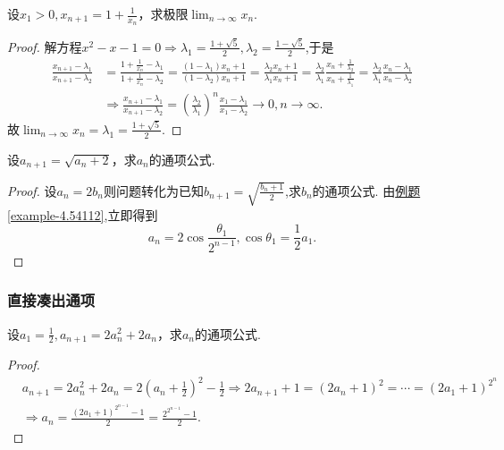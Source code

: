 \documentclass[../../main.tex]{subfiles}%
\begin{document}
\begin{example}
设\(x_1 > 0,x_{n + 1}=1+\frac{1}{x_n}\)，求极限\(\lim_{n\rightarrow\infty}x_n\).
\end{example}
\begin{proof}

解方程\(x^2 - x - 1 = 0\Rightarrow\lambda_1=\frac{1 + \sqrt{5}}{2},\lambda_2=\frac{1 - \sqrt{5}}{2}\),于是
\begin{align*}
\frac{x_{n + 1}-\lambda_1}{x_{n + 1}-\lambda_2}&=\frac{1+\frac{1}{x_n}-\lambda_1}{1+\frac{1}{x_n}-\lambda_2}=\frac{(1 - \lambda_1)x_n + 1}{(1 - \lambda_2)x_n + 1}=\frac{\lambda_2x_n + 1}{\lambda_1x_n + 1}=\frac{\lambda_2}{\lambda_1}\frac{x_n+\frac{1}{\lambda_2}}{x_n+\frac{1}{\lambda_1}}=\frac{\lambda_2}{\lambda_1}\frac{x_n-\lambda_1}{x_n-\lambda_2}\\
&\Rightarrow\frac{x_{n + 1}-\lambda_1}{x_{n + 1}-\lambda_2}=\left(\frac{\lambda_2}{\lambda_1}\right)^n\frac{x_1-\lambda_1}{x_1-\lambda_2}\to 0,n\to \infty.
\end{align*}
故$\lim_{n\rightarrow\infty}x_n=\lambda_1=\frac{1 + \sqrt{5}}{2}.$

\end{proof}

\begin{example}
设\(a_{n + 1}=\sqrt{a_n + 2}\)，求\(a_n\)的通项公式.
\end{example}
\begin{proof}

设\(a_n = 2b_n\)则问题转化为已知$b_{n+1}=\sqrt{\frac{b_n+1}{2}}$,求$b_n$的通项公式.
由\hyperref[example-4.54112]{例题\ref{example-4.54112}},立即得到\[a_n = 2\cos\frac{\theta_1}{2^{n - 1}},\cos\theta_1=\frac{1}{2}a_1.\]

\end{proof}


\subsubsection{直接凑出通项}

\begin{example}
设\(a_1=\frac{1}{2},a_{n + 1}=2a_n^2 + 2a_n\)，求\(a_n\)的通项公式.
\end{example}
\begin{proof}

\begin{align*}
&a_{n + 1}=2a_n^2 + 2a_n = 2\left(a_n+\frac{1}{2}\right)^2-\frac{1}{2}\Rightarrow 2a_{n + 1}+1=(2a_n + 1)^2=\cdots=(2a_1 + 1)^{2^n}\\
&\Rightarrow a_n=\frac{(2a_1 + 1)^{2^{n - 1}}-1}{2}=\frac{2^{2^{n - 1}}-1}{2}.
\end{align*}

\end{proof}
\end{document}
